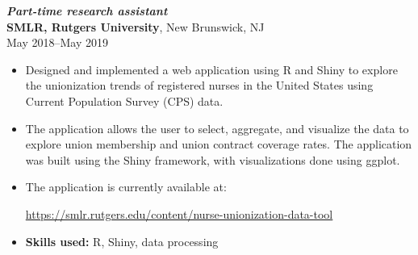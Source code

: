 \documentclass[letterpaper,12pt]{article}
\begin{document}
\iffalse
\textit{\textbf{Part-time research assistant}} \\
\textbf{Alan M. Voorhees Transportation Center, Bloustein School of
  Planning and Public Policy, Rutgers University},
New Brunswick, NJ \\
June 2018--July 2018
\begin{itemize}
\item Used R and the Elsevier Scopus API to scrape roughly two-decades
  worth of abstracts from articles published in transportation-related
  journals. The goal was to determine whether writing quality in these
  journals has degraded or improved with time.
\item The scraped data was cleaned using R and fed into the Coh-Metrix
  system, developed at the University of Memphis to analyze linguistic
  cohesion among a collection of text corpora.
\item No conclusive results from this brief study, but open to further
  investigation.
\item \textbf{Skills used:} R, data processing
\end{itemize}
\fi

\textit{\textbf{Part-time research assistant}} \\
\textbf{SMLR, Rutgers University},
New Brunswick, NJ \\
May 2018--May 2019
\begin{itemize}
\item Designed and implemented a web application using R and Shiny to
  explore the unionization trends of registered nurses in the United
  States using Current Population Survey (CPS) data.
\item The application allows the user to select, aggregate, and
  visualize the data to explore union membership and union contract
  coverage rates. The application was built using the Shiny framework,
  with visualizations done using ggplot.
\item The application is currently available at:
  \begin{center}
    \url{https://smlr.rutgers.edu/content/nurse-unionization-data-tool}
  \end{center}
\item \textbf{Skills used:} R, Shiny, data processing
\end{itemize}
\end{document}
